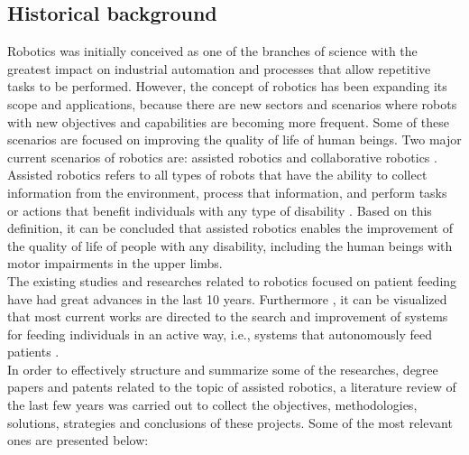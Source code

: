 \documentclass[11pt]{report} %
\begin{document}
\subsection{Historical background}

Robotics was initially conceived as one of the branches of science with the greatest impact on industrial automation and processes that allow repetitive tasks to be performed. However, the concept of robotics has been expanding its scope and applications, because there are new sectors and scenarios where robots with new objectives and capabilities are becoming more frequent. Some of these scenarios are focused on improving the quality of life of human beings. Two major current scenarios of robotics are: assisted robotics and collaborative robotics \citep{cite_service_robotics_and_human_labor}.\\

Assisted robotics refers to all types of robots that have the ability to collect information from the environment, process that information, and perform tasks or actions that benefit individuals with any type of disability \citep{cite_assited_robotics_stanford_lecture_jaffe}. Based on this definition, it can be concluded that assisted robotics enables the improvement of the quality of life of people with any disability, including the human beings with motor impairments in the upper limbs.\\

The existing studies and researches related to robotics focused on patient feeding have had great advances in the last 10 years. Furthermore , it can be visualized that most current works are directed to the search and improvement of systems for feeding individuals in an active way, i.e., systems that autonomously feed patients \citep{cite_park_active_robot_assisted_feeding}.\\

In order to effectively structure and summarize some of the researches, degree papers and patents related to the topic of assisted robotics, a literature review of the last few years was carried out to collect the objectives, methodologies, solutions, strategies and conclusions of these projects. Some of the most relevant ones are presented below:\\
\end{document}
